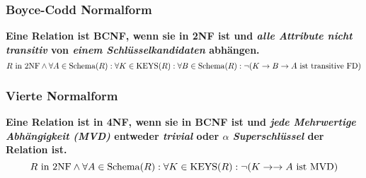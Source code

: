 
\subsubsection{Boyce-Codd Normalform} %
	\textbf{Eine Relation ist BCNF, wenn sie in 2NF ist und \textit{alle Attribute nicht transitiv} von \textit{einem Schlüsselkandidaten} abhängen.}
	\begin{equation*}
		R \text{ in 2NF} \land \forall A \in \operatorname{Schema}(R) : \forall K \in \operatorname{KEYS}(R) : \forall B \in \operatorname{Schema}(R) : \lnot(K \rightarrow B \rightarrow A \text{ ist transitive FD})
	\end{equation*}


	\subsubsection{Vierte Normalform} %
		\textbf{Eine Relation ist in 4NF, wenn sie in BCNF ist und \textit{jede Mehrwertige Abhängigkeit (MVD)} entweder \textit{trivial} oder \(\alpha\) \textit{Superschlüssel} der Relation ist.}
		\begin{equation*}
			R \text{ in 2NF} \land \forall A \in \operatorname{Schema}(R) : \forall K \in \operatorname{KEYS}(R) : \lnot(K \rightarrow \rightarrow A \text{ ist MVD})
		\end{equation*}

